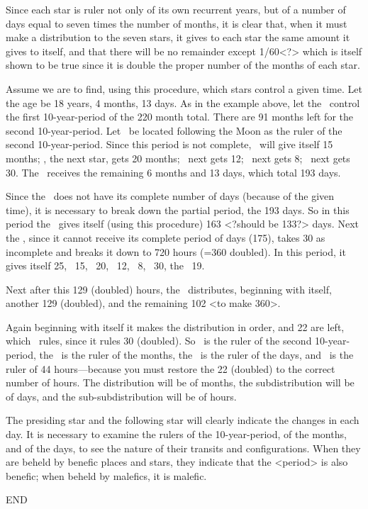 Since each star is ruler not only of its own recurrent years, but of a number of days equal to seven times the number of months, it is clear that, when it must make a distribution to the seven stars, it gives to each star the same amount it gives to itself, and that there will be no remainder except 1/60<?> which is itself shown to be true since it is double the proper number of the months of each star.

Assume we are to find, using this procedure, which stars control a given time. Let the age be 18 years, 4 months, 13 days. As in the example above, let the \Moon\, control the first 10-year-period of the
220 month total. There are 91 months left for the second 10-year-period. Let \Mars\, be located following the Moon as the ruler of the second 10-year-period. Since this period is not complete, \Mars\, will give itself 15 months; \Mercury, the next star, gets 20 months; \Jupiter\, next gets 12; \Venus\, next gets 8; \Saturn\, next gets 30. The \Sun\, receives the remaining 6 months and 13 days, which total 193 days. 

Since the \Sun\, does not have its complete number of days (because of the given time), it is necessary to break down the partial period, the 193 days. So in this period the \Sun\, gives itself (using this procedure) 163 <?should be 133?> days. Next the \Moon, since it cannot receive its complete period of days (175), takes 30 as incomplete and breaks it down to 720 hours (=360 doubled). In this period, it gives itself 25, \Mars\, 15, \Mercury\, 20, \Jupiter\, 12, \Venus\, 8, \Saturn\, 30, the \Sun\, 19. 

Next after this 129 (doubled) hours, the \Moon\, distributes, beginning with itself, another 129 (doubled), and the remaining 102 <to make 360>. 

Again beginning with itself it makes the distribution in order, and 22 are left, which \Saturn\, rules, since it rules 30 (doubled). So \Mars\, is the ruler of the second 10-year-period, the \Sun\, is the ruler of the months, the \Moon\, is the ruler of the days, and \Saturn\, is the ruler of 44 hours—because you must restore the 22 (doubled) to the correct number of hours. The distribution will be of months, the subdistribution will be of days, and the sub-subdistribution will be of hours.

The presiding star and the following star will clearly indicate the changes in each day. It is necessary to examine the rulers of the 10-year-period, of the months, and of the days, to see the nature of their transits and configurations. When they are beheld by benefic places and stars, they indicate that the <period> is also benefic; when beheld by malefics, it is malefic.

END



\newpage